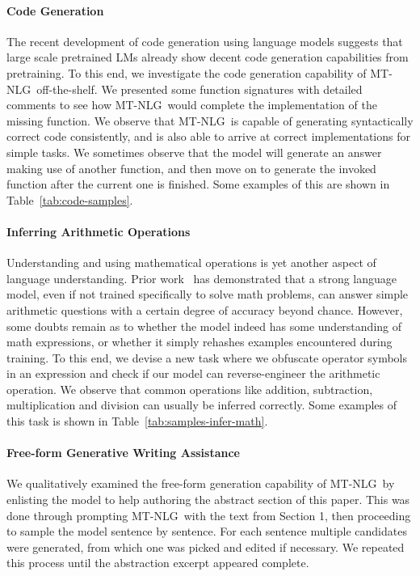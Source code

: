 \documentclass[11pt]{article}
\newcommand{\ours}{MT-NLG}
\begin{document}
\paragraph{Code Generation}
The recent development of code generation using language models suggests that large scale pretrained LMs already show decent code generation capabilities from pretraining. To this end, we investigate the code generation capability of \ours~off-the-shelf. We presented some function signatures with detailed comments to see how \ours~would complete the implementation of the missing function. We observe that \ours~is capable of generating syntactically correct code consistently, and is also able to arrive at correct implementations for simple tasks. We sometimes observe that the model will generate an answer making use of another function, and then move on to generate the invoked function after the current one is finished. Some examples of this are shown in Table~\ref{tab:code-samples}.

\paragraph{Inferring Arithmetic Operations}

Understanding and using mathematical operations is yet another aspect of language understanding. Prior work~\citep{brown2020language} has demonstrated that a strong language model, even if not trained specifically to solve math problems, can answer simple arithmetic questions with a certain degree of accuracy beyond chance. However, some doubts remain as to whether the model indeed has some understanding of math expressions, or whether it simply rehashes examples encountered during training. To this end, we devise a new task where we obfuscate operator symbols in an expression and check if our model can reverse-engineer the arithmetic operation. We observe that common operations like addition, subtraction, multiplication and division can usually be inferred correctly. Some examples of this task is shown in Table~\ref{tab:samples-infer-math}.

\paragraph{Free-form Generative Writing Assistance}

We qualitatively examined the free-form generation capability of \ours~by enlisting the model to help authoring the abstract section of this paper. This was done through prompting \ours~with the text from Section 1, then proceeding to sample the model sentence by sentence. For each sentence multiple candidates were generated, from which one was picked and edited if necessary. We repeated this process until the abstraction excerpt appeared complete.
\end{document}

